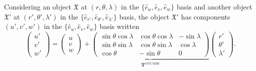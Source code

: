 \documentclass[11pt,dvipsnames]{thesis}
\begin{document}
Considering an object $\mathfrak{X}$ at $(r,\theta,\lambda)$ in the $\{\hat{e}_u, \hat{e}_v, \hat{e}_w\}$ basis and another object $\mathfrak{X}'$ at $(r', \theta', \lambda')$ in the $\{\hat{e}_{r'}, \hat{e}_{\theta'}, \hat{e}_{\lambda'}\}$ basis, the object $\mathfrak{X}'$ has components $(u', v', w')$ in the $\{\hat{e}_u, \hat{e}_v, \hat{e}_w\}$ basis written
\begin{equation}
\begin{pmatrix}u' \\ v' \\ w'\end{pmatrix} = \begin{pmatrix}u \\ v \\ w\end{pmatrix} + \underbrace{\begin{pmatrix}\sin\theta\cos\lambda & \cos\theta\cos\lambda & -\sin\lambda \\ \sin\theta\sin\lambda & \cos\theta\sin\lambda & \cos\lambda \\ \cos\theta & -\sin\theta & 0\end{pmatrix}}_{\mathbf{T}^{\text{cart}/\text{sphr}}} \begin{pmatrix}r' \\ \theta' \\ \lambda'\end{pmatrix}.
\end{equation}
\end{document}
